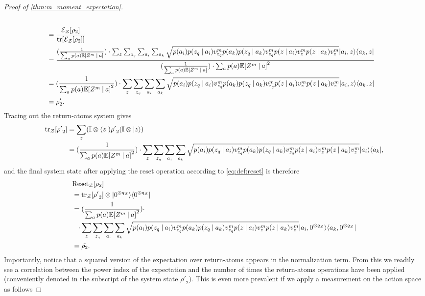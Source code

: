 \documentclass{article}
\DeclarePairedDelimiter{\bra}{\langle}{\rvert} %
\DeclarePairedDelimiter{\ket}{\lvert}{\rangle} %
\DeclarePairedDelimiter{\bparen}{[}{]} %
\newcommand{\E}{\mathbb{E}} %
\newcommand{\bfunc}[2]{#1\bparen*{#2}} %
\newcommand{\given}[1][]{\:#1\vert\:}
\begin{document}
\begin{proof}[Proof of \cref{thm:m_moment_expectation}]
\begin{align}
\\&= \frac{\bfunc{\mathcal{E}_{\mathcal{Z}}}{\rho_2}}{\bfunc{\textrm{tr}}{\bfunc{\mathcal{E}_{\mathcal{Z}}}{\rho_2}}}
\\&= \frac{(\frac{1}{\sum_{a} p(a) \bfunc{\mathbb{E}}{Z^{m} \given a}}) \cdot \sum_{z} \sum_{z_q} \sum_{a_i} \sum_{a_k} \sqrt{p(a_i) p(z_q \given a_i) v_{z_q}^{m} p(a_k) p(z_q \given a_k) v_{z_q}^{m} p(z \given a_i) v_{z}^{m} p(z \given a_k) v_{z}^{m}} \ket{a_i, z}\bra{a_k, z}}{(\frac{1}{\sum_{a} p(a) \bfunc{\mathbb{E}}{Z^{m} \given a}}) \cdot \sum_{a} p(a) \bfunc{\mathbb{E}}{Z^{m} \given a}^2}
\\&= (\frac{1}{\sum_{a} p(a) \bfunc{\mathbb{E}}{Z^{m} \given a}^2}) \cdot \sum_{z} \sum_{z_q} \sum_{a_i} \sum_{a_k} \sqrt{p(a_i) p(z_q \given a_i) v_{z_q}^{m} p(a_k) p(z_q \given a_k) v_{z_q}^{m} p(z \given a_i) v_{z}^{m} p(z \given a_k) v_{z}^{m}} \ket{a_i, z}\bra{a_k, z}
\\&= \rho'_2.
\end{align}
% 
Tracing out the return-atoms system gives
% 
\begin{align}
\bfunc{\textrm{tr}_{\mathcal{Z}}}{{\rho'}_2}
&= \sum_{z} (\mathbb{I}\otimes\bra{z}) {\rho'}_2 (\mathbb{I}\otimes\ket{z})
\\&= (\frac{1}{\sum_{a} p(a) \bfunc{\mathbb{E}}{Z^{m} \given a}^2}) \cdot \sum_{z} \sum_{z_q} \sum_{a_i} \sum_{a_k} \sqrt{p(a_i) p(z_q \given a_i) v_{z_q}^{m} p(a_k) p(z_q \given a_k) v_{z_q}^{m} p(z \given a_i) v_{z}^{m} p(z \given a_k) v_{z}^{m}} \ket{a_i}\bra{a_k},
\end{align}
% 
and the final system state after applying the reset operation according to \cref{eq:def:reset} is therefore
% 
\begin{align}
&\bfunc{\textrm{Reset}_{\mathcal{Z}}}{\rho_2}
\\&= \bfunc{\textrm{tr}_{\mathcal{Z}}}{{\rho'}_2} \otimes \ket{0^{\otimes q_{\mathcal{Z}}}}\bra{0^{\otimes q_{\mathcal{Z}}}}
\\&= (\frac{1}{\sum_{a} p(a) \bfunc{\mathbb{E}}{Z^{m} \given a}^2}) \cdot 
\\&~~\cdot \sum_{z} \sum_{z_q} \sum_{a_i} \sum_{a_k} \sqrt{ p(a_i) p(z_q \given a_i) v_{z_q}^{m} p(a_k) p(z_q \given a_k) v_{z_q}^{m} p(z \given a_i) v_{z}^{m} p(z \given a_k) v_{z}^{m}} \ket{a_i,0^{\otimes q_{\mathcal{Z}}}}\bra{a_k,0^{\otimes q_{\mathcal{Z}}}}
\\&= \tilde{\rho_2}.
\end{align}
% 
Importantly, notice that a squared version of the expectation over return-atoms appears in the normalization term. From this we readily see a correlation between the power index of the expectation and the number of times the return-atoms operations have been applied (conveniently denoted in the subscript of the system state ${\rho'}_2$). This is even more prevalent if we apply a measurement on the action space as follows

\end{proof}
\end{document}
